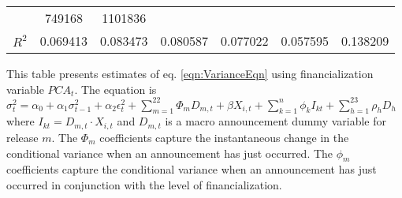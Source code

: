 \begin{sidewaystable}
{\begin{tabular}{@{}lllllllllllll@{}}
                               & \multicolumn{2}{c}{ 749168 }                                                   & \multicolumn{2}{c}{ 1101836 }                                                 \\ \textbf{$R^2$}             &\multicolumn{2}{c}{ 0.069413 }                                                 & \multicolumn{2}{c}{ 0.083473 }                                                 & \multicolumn{2}{c}{ 0.080587 }                                                 & \multicolumn{2}{c}{ 0.077022 }                                                 & \multicolumn{2}{c}{ 0.057595 }                                                   & \multicolumn{2}{c}{ 0.138209 }                                                 \\ \bottomrule 
\end{tabular}
}
\begin{tablenotes}\item 
        \singlespacing
        \footnotesize
        This table presents estimates of eq. \ref{eqn:VarianceEqn} using financialization variable $PCA_t$. The equation is $\sigma_{t}^2=\alpha_0+\alpha_1 \sigma_{t-1}^2+\alpha_2 \epsilon_t^2 +\sum_{m=1}^{22} \Phi_m D_{m,t}+\beta X_{i,t}+\sum_{k=1}^n \phi_k I_{kt} + \sum_{h=1}^{23} \rho_h D_h$ where $I_{kt}=D_{m,t} \cdot X_{i,t}$ and $D_{m,t}$ is a macro announcement dummy variable for release $m$. The $\Phi_m$ coefficients capture the instantaneous change in the conditional variance when an announcement has just occurred. The $\phi_m$ coefficients capture the conditional variance when an announcement has just occurred in conjunction with the level of financialization.
\end{tablenotes}
\end{sidewaystable}


